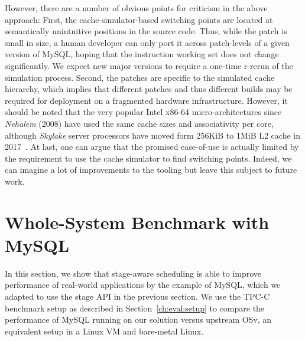 \documentclass[12pt,a4paper]{book}
\begin{document}
However, there are a number of obvious points for criticism in the above approach:
First, the cache-simulator-based switching points are located at semantically unintuitive positions in the source code.
Thus, while the patch is small in size, a human developer can only port it across patch-levels of a given version of MySQL, hoping that the instruction working set does not change significantly.
We expect new major versions to require a one-time r-rerun of the simulation process.
Second, the patches are specific to the simulated cache hierarchy, which implies that different patches and thus different builds may be required for deployment on a fragmented hardware infrastructure.
However, it should be noted that the very popular Intel x86-64 micro-architectures since \emph{Nehalem} (2008) have used the same cache sizes and associativity per core, although \emph{Skylake} server processors have moved form 256KiB to 1MiB L2 cache in 2017~\cite{nehalemCacheHierarchy,skylakeServerCacheHierarchy}.
At last, one can argue that the promised ease-of-use is actually limited by the requirement to use the cache simulator to find switching points.
Indeed, we can imagine a lot of improvements to the tooling but leave this subject to future work.

\section{Whole-System Benchmark with MySQL}\label{ch:eval:perf}
In this section, we show that stage-aware scheduling is able to improve performance of real-world applications by the example of MySQL, which we adapted to use the stage API in the previous section.
We use the TPC-C benchmark setup as described in Section~\ref{ch:eval:setup} to compare the performance of MySQL running on our solution versus upstream OSv, an equivalent setup in a Linux VM and bare-metal Linux.
\end{document}
